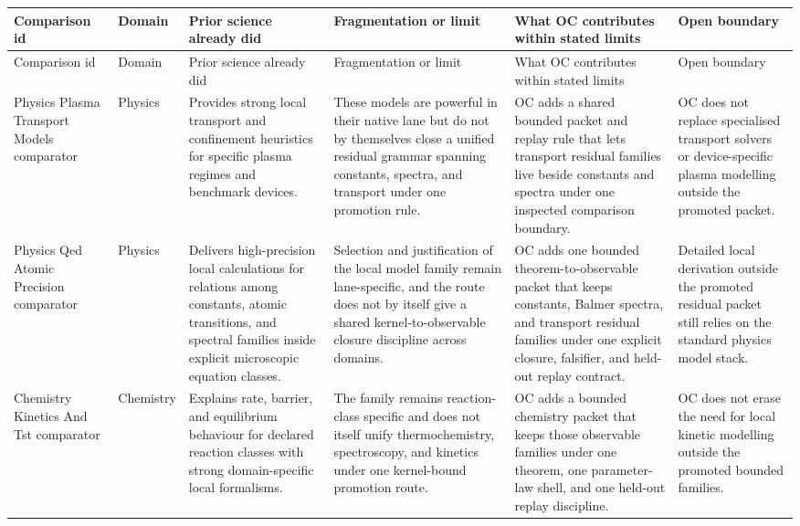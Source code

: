 \begin{longtable}{@{}L{0.17\textwidth}L{0.09\textwidth}L{0.17\textwidth}L{0.17\textwidth}L{0.20\textwidth}L{0.14\textwidth}@{}}
\toprule
Comparison id & Domain & Prior science already did & Fragmentation or limit & What OC contributes within stated limits & Open boundary \\
\midrule
\endfirsthead
\toprule
Comparison id & Domain & Prior science already did & Fragmentation or limit & What OC contributes within stated limits & Open boundary \\
\midrule
\endhead
Physics Plasma Transport Models comparator & Physics & Provides strong local transport and confinement heuristics for specific plasma regimes and benchmark devices. & These models are powerful in their native lane but do not by themselves close a unified residual grammar spanning constants, spectra, and transport under one promotion rule. & OC adds a shared bounded packet and replay rule that lets transport residual families live beside constants and spectra under one inspected comparison boundary. & OC does not replace specialised transport solvers or device-specific plasma modelling outside the promoted packet. \\
Physics Qed Atomic Precision comparator & Physics & Delivers high-precision local calculations for relations among constants, atomic transitions, and spectral families inside explicit microscopic equation classes. & Selection and justification of the local model family remain lane-specific, and the route does not by itself give a shared kernel-to-observable closure discipline across domains. & OC adds one bounded theorem-to-observable packet that keeps constants, Balmer spectra, and transport residual families under one explicit closure, falsifier, and held-out replay contract. & Detailed local derivation outside the promoted residual packet still relies on the standard physics model stack. \\
Chemistry Kinetics And Tst comparator & Chemistry & Explains rate, barrier, and equilibrium behaviour for declared reaction classes with strong domain-specific local formalisms. & The family remains reaction-class specific and does not itself unify thermochemistry, spectroscopy, and kinetics under one kernel-bound promotion route. & OC adds a bounded chemistry packet that keeps those observable families under one theorem, one parameter-law shell, and one held-out replay discipline. & OC does not erase the need for local kinetic modelling outside the promoted bounded families. \\

\end{longtable}
